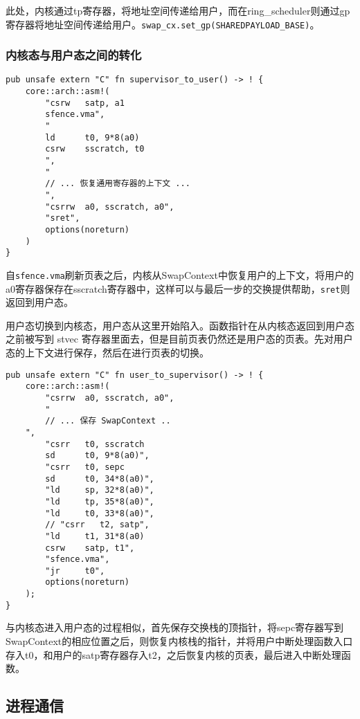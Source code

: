 此处，内核通过tp寄存器，将地址空间传递给用户，而在ring\_scheduler则通过gp寄存器将地址空间传递给用户。\verb|swap_cx.set_gp(SHAREDPAYLOAD_BASE)|。


\subsubsection{内核态与用户态之间的转化}

\begin{lstlisting}[caption=由内核态进入用户态]
pub unsafe extern "C" fn supervisor_to_user() -> ! {
    core::arch::asm!(
        "csrw   satp, a1
        sfence.vma",
        "
        ld      t0, 9*8(a0)
        csrw    sscratch, t0
        ",
        "
        // ... 恢复通用寄存器的上下文 ...
        ",
        "csrrw  a0, sscratch, a0",
        "sret",
        options(noreturn)
    )
}
\end{lstlisting}

自\verb|sfence.vma|刷新页表之后，内核从SwapContext中恢复用户的上下文，将用户的a0寄存器保存在sscratch寄存器中，这样可以与最后一步的交换提供帮助，\verb|sret|则返回到用户态。


用户态切换到内核态，用户态从这里开始陷入。函数指针在从内核态返回到用户态之前被写到 stvec 寄存器里面去，但是目前页表仍然还是用户态的页表。先对用户态的上下文进行保存，然后在进行页表的切换。

\begin{lstlisting}[caption=由用户态进入内核态]
pub unsafe extern "C" fn user_to_supervisor() -> ! {
    core::arch::asm!(
        "csrrw  a0, sscratch, a0",
        "
        // ... 保存 SwapContext ..
    ",
        "csrr   t0, sscratch
        sd      t0, 9*8(a0)",
        "csrr   t0, sepc
        sd      t0, 34*8(a0)",
        "ld     sp, 32*8(a0)",
        "ld     tp, 35*8(a0)",
        "ld     t0, 33*8(a0)",
        // "csrr   t2, satp",
        "ld     t1, 31*8(a0)
        csrw    satp, t1",
        "sfence.vma",
        "jr     t0",
        options(noreturn)
    );
}
\end{lstlisting}


与内核态进入用户态的过程相似，首先保存交换栈的顶指针，将sepc寄存器写到SwapContext的相应位置之后，则恢复内核栈的指针，并将用户中断处理函数入口存入t0，和用户的satp寄存器存入t2，之后恢复内核的页表，最后进入中断处理函数。

\subsection{进程通信}

